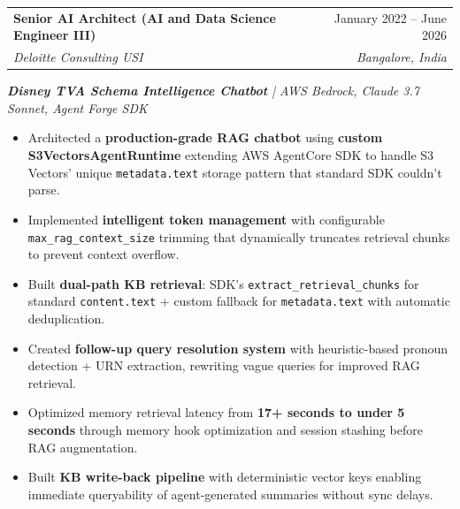 \documentclass[letterpaper,10pt]{article}
\makeatletter
\newcommand{\resumeItem}[1]{
  \item\small{
    {#1 \vspace{-2pt}}
  }
}
\newcommand{\resumeSubheading}[4]{
  \vspace{-2pt}\item
    \begin{tabular*}{0.97\textwidth}[t]{l@{\extracolsep{\fill}}r}
      \textbf{#1} & #2 \\
      \textit{\small#3} & \textit{\small #4} \\
    \end{tabular*}\vspace{-7pt}
}
\newcommand{\resumeItemListStart}{\begin{itemize}}
\newcommand{\resumeItemListEnd}{\end{itemize}\vspace{-5pt}}
\makeatother
\begin{document}
      \vspace{12pt}
      \vspace{12pt}
    \vspace{8pt}
    \resumeSubheading
      {Senior AI Architect (AI and Data Science Engineer III)}{January 2022 -- June 2026}
      {Deloitte Consulting USI}{Bangalore, India}

      \vspace{12pt}
      \vspace{12pt}
      \textit{\small\textbf{Disney TVA Schema Intelligence Chatbot} | AWS Bedrock, Claude 3.7 Sonnet, Agent Forge SDK}
      \resumeItemListStart
        \resumeItem{Architected a \textbf{production-grade RAG chatbot} using \textbf{custom S3VectorsAgentRuntime} extending AWS AgentCore SDK to handle S3 Vectors' unique \texttt{metadata.text} storage pattern that standard SDK couldn't parse.}
        \resumeItem{Implemented \textbf{intelligent token management} with configurable \texttt{max\_rag\_context\_size} trimming that dynamically truncates retrieval chunks to prevent context overflow.}
        \resumeItem{Built \textbf{dual-path KB retrieval}: SDK's \texttt{extract\_retrieval\_chunks} for standard \texttt{content.text} + custom fallback for \texttt{metadata.text} with automatic deduplication.}
        \resumeItem{Created \textbf{follow-up query resolution system} with heuristic-based pronoun detection + URN extraction, rewriting vague queries for improved RAG retrieval.}
        \resumeItem{Optimized memory retrieval latency from \textbf{17+ seconds to under 5 seconds} through memory hook optimization and session stashing before RAG augmentation.}
        \resumeItem{Built \textbf{KB write-back pipeline} with deterministic vector keys enabling immediate queryability of agent-generated summaries without sync delays.}
      \resumeItemListEnd
\end{document}
